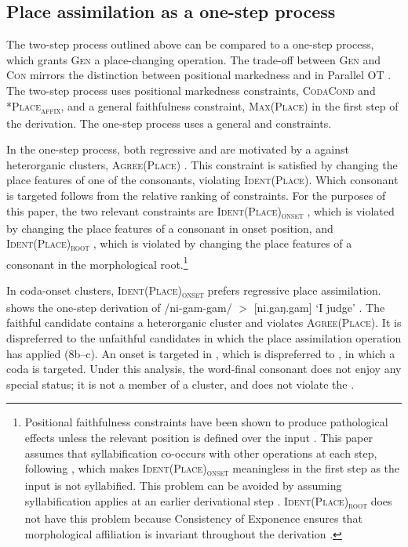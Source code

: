 \documentclass[output=paper,newtxmath,modfonts,nonflat,draftmode]{langsci/langscibook}
\begin{document}
{{\subsection{Place assimilation as a one-step process}

The two-step process outlined above can be compared to a one-step process, which grants \textsc{Gen} a place-changing operation. The trade-off between \textsc{Gen} and \textsc{Con} mirrors the distinction between positional markedness and  in Parallel OT \citep{zoll2004}. The two-step process uses positional markedness constraints, \textsc{CodaCond} and \textsc{*Place\textsubscript{affix}}, and a general faithfulness constraint, \textsc{Max(Place)} in the first step of the derivation. The one-step process uses a general  and  constraints.

In the one-step process, both regressive and  are motivated by a  against heterorganic clusters, \textsc{Agree(Place)} \citep{yip1991,lombardi1999,bakovic2000,bakovic2007}. This constraint is satisfied by changing the place features of one of the consonants, violating \textsc{Ident(Place)}. Which consonant is targeted follows from the relative ranking of  constraints. For the purposes of this paper, the two relevant constraints are \textsc{Ident(Place)\textsubscript{onset}} \citep{beckman1998}, which is violated by changing the place features of a consonant in onset position, and \textsc{Ident(Place)\textsubscript{root}} \citep{mccarthyprince1995}, which is violated by changing the place features of a consonant in the morphological root.\footnote{Positional faithfulness constraints have been shown to produce pathological effects unless the relevant position is defined over the input \citep{jesney2011}. This paper assumes that syllabification co-occurs with other operations at each step, following \citet{mccarthy2008}, which makes \textsc{Ident(Place)\textsubscript{onset}} meaningless in the first step as the input is not syllabified. This problem can be avoided by assuming syllabification applies at an earlier derivational step \citep{elfner2009}. \textsc{Ident(Place)\textsubscript{root}} does not have this problem because Consistency of Exponence ensures that morphological affiliation is invariant throughout the derivation \citep{mccarthyprince1993b}.}

In coda-onset clusters, \textsc{Ident(Place)\textsubscript{onset}} prefers regressive place assimilation.  shows the one-step derivation of /{ni-gam-gam}/ $>$ [{ni.gaŋ.gam}] `I judge' . The faithful candidate  contains a heterorganic cluster and violates \textsc{Agree(Place)}. It is dispreferred to the unfaithful candidates in which the place assimilation operation has applied (8b--c). An onset is targeted in , which is dispreferred to , in which a coda is targeted. Under this analysis, the word-final consonant does not enjoy any special status; it is not a member of a cluster, and does not violate the .

}}
\end{document}
